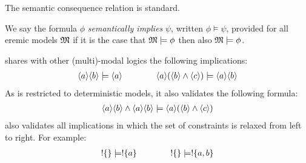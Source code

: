 
\NI The semantic consequence relation is standard.

\begin{definition} 
 We say the formula $\phi$ \emph{semantically implies} $\psi$, written $\phi
   \models \psi$, provided for all eremic models $\frak{M}$ if it is the
   case that $\frak{M} \models \phi$ then also $\frak{M} \models \phi$.
\end{definition}

\begin{example}
\ELABR{} shares with other (multi)-modal logics the following
implications:
\begin{eqnarray*}
\langle a \rangle \langle b \rangle \models \langle a \rangle \qquad\qquad
\langle a \rangle (\langle b \rangle \land \langle c \rangle ) \models \langle a \rangle \langle b \rangle \end{eqnarray*}
As \ELABR{} is restricted to deterministic models, it also
validates the following formula:
\begin{eqnarray*}
\langle a \rangle \langle b \rangle \land \langle a \rangle \langle b \rangle \models \langle a \rangle (\langle b \rangle \land \langle c \rangle )
\end{eqnarray*}
\ELABR{} also validates all implications in which the set of constraints is relaxed from left to right. For example:
\begin{eqnarray*}
! \{\} \models ! \{a\} 
 \qquad\qquad
! \{\} \models ! \{a, b\} 
\end{eqnarray*}
\end{example}
